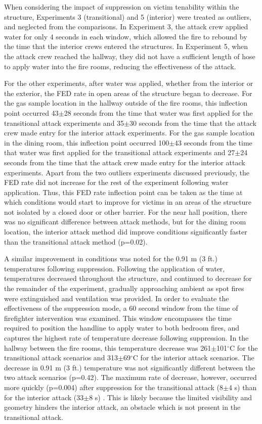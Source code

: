 \documentclass[12pt,oneside]{article}
\begin{document}
When considering the impact of suppression on victim tenability within the structure, Experiments 3 (transitional) and 5 (interior) were treated as outliers, and neglected from the comparisons. In Experiment 3, the attack crew applied water for only 4 seconds in each window, which allowed the fire to rebound by the time that the interior crews entered the structures. In Experiment 5, when the attack crew reached the hallway, they did not have a sufficient length of hose to apply water into the fire rooms, reducing the effectiveness of the attack. 

For the other experiments, after water was applied, whether from the interior or the exterior, the FED rate in open areas of the structure began to decrease. For the gas sample location in the hallway outside of the fire rooms, this inflection point occurred 43$\pm$28 seconds from the time that water was first applied for the transitional attack experiments and 35$\pm$30 seconds from the time that the attack crew made entry for the interior attack experiments. For the gas sample location in the dining room, this inflection point occurred 100$\pm$43 seconds from the time that water was first applied for the transitional attack experiments and 27$\pm$24 seconds from the time that the attack crew made entry for the interior attack experiments. Apart from the two outliers experiments discussed previously, the FED rate did not increase for the rest of the experiment following water application. Thus, this FED rate inflection point can be taken as the time at which conditions would start to improve for victims in an areas of the structure not isolated by a closed door or other barrier. For the near hall position, there was no significant difference between attack methods, but for the dining room location, the interior attack method did improve conditions significantly faster than the transitional attack method (p=0.02). 

A similar improvement in conditions was noted for the 0.91 m (3 ft.) temperatures following suppression. Following the application of water, temperatures decreased throughout the structure, and continued to decrease for the remainder of the experiment, gradually approaching ambient as spot fires were extinguished and ventilation was provided. In order to evaluate the effectiveness of the suppression mode, a 60 second window from the time of firefighter intervention was examined. This window encompasses the time required to position the handline to apply water to both bedroom fires, and captures the highest rate of temperature decrease following suppression. In the hallway between the fire rooms, this temperature decrease was 261$\pm$101$^{\circ}$C for the transitional attack scenarios and 313$\pm$69$^{\circ}$C for the interior attack scenarios. The decrease in 0.91 m (3 ft.) temperature was not significantly different between the two attack scenarios (p=0.42). The maximum rate of decrease, however, occurred more quickly (p=0.004) after suppression for the transitional attack (8$\pm$4 s) than for the interior attack (33$\pm$8 s) . This is likely because the limited visibility and geometry hinders the interior attack, an obstacle which is not present in the transitional attack. 
\end{document}
